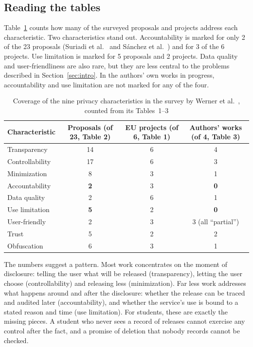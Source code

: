 \subsection{Reading the tables}
Table~\ref{tab:coverage} counts how many of the surveyed proposals and projects address each characteristic. Two characteristics stand out. Accountability is marked for only 2 of the 23 proposals (Suriadi et al.~\cite{suriadi2009usercentric} and Sánchez et al.~\cite{sanchez2012enhancing}) and for 3 of the 6 projects. Use limitation is marked for 5 proposals and 2 projects. Data quality and user-friendliness are also rare, but they are less central to the problems described in Section~\ref{sec:intro}. In the authors' own works in progress, accountability and use limitation are not marked for any of the four.

\begin{table}[t]
\centering
\caption{Coverage of the nine privacy characteristics in the survey by Werner et al.~\cite{werner2017survey}, counted from its Tables~1--3}
\label{tab:coverage}
\small
\begin{tabular}{@{}lccc@{}}
\toprule
Characteristic & Proposals (of 23, Table 2) & EU projects (of 6, Table 1) & Authors' works (of 4, Table 3) \\
\midrule
Transparency     & 14 & 6 & 4 \\
Controllability  & 17 & 6 & 3 \\
Minimization     &  8 & 3 & 1 \\
Accountability   & \textbf{2} & 3 & \textbf{0} \\
Data quality     &  2 & 6 & 1 \\
Use limitation   & \textbf{5} & 2 & \textbf{0} \\
User-friendly    &  2 & 3 & 3 (all ``partial'') \\
Trust            &  5 & 2 & 2 \\
Obfuscation      &  6 & 3 & 1 \\
\bottomrule
\end{tabular}
\end{table}

The numbers suggest a pattern. Most work concentrates on the moment of disclosure: telling the user what will be released (transparency), letting the user choose (controllability) and releasing less (minimization). Far less work addresses what happens around and after the disclosure: whether the release can be traced and audited later (accountability), and whether the service's use is bound to a stated reason and time (use limitation). For students, these are exactly the missing pieces. A student who never sees a record of releases cannot exercise any control after the fact, and a promise of deletion that nobody records cannot be checked.

